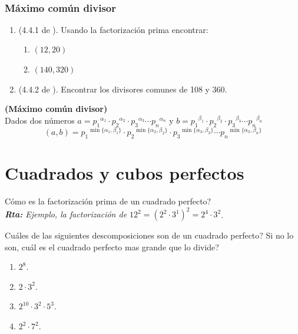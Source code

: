 \newpage
\begin{exers}{\ \\}
	\begin{center}
		\vspace{-1cm}
		\subsubsection*{ Máximo común divisor }\label{ejercicios_subsubsection_MCD}
	\end{center}

	\begin{enumerate}
		\item (4.4.1 de \cite{Aops_TN}). Usando la factorización prima encontrar:
		\begin{enumerate}[label=\Alph*)]
			\item $(12,20)$
			\item $(140,320)$
		\end{enumerate}
		\item (4.4.2 de \cite{Aops_TN}). Encontrar los divisores comunes de 108 y 360.
	\end{enumerate}
\end{exers}
\newpage

\begin{prop}\textbf{(Máximo común divisor)}\\
	Dados dos números $a={p_1}^{\alpha_1} \cdot {p_2}^{\alpha_2} \cdot {p_3}^{\alpha_3} \cdots {p_n}^{\alpha_n}$ y $b={p_1}^{\beta_1} \cdot {p_2}^{\beta_2} \cdot {p_3}^{\beta_3} \cdots {p_n}^{\beta_n}$
	\[
	(a,b)= {p_1}^{\min\{\alpha_1,\beta_1\}} \cdot {p_2}^{\min\{\alpha_2,\beta_2\}} \cdot {p_3}^{\min\{\alpha_3,\beta_3\}} \cdots {p_n}^{\min\{\alpha_3,\beta_n\}}
	\]
\end{prop}

\section{Cuadrados y cubos perfectos}\label{section_cuadrados_cubos_perfectos}

\begin{ejemplo}
	Cómo es la factorización prima de un cuadrado perfecto?\\
	\textit{\textbf{Rta:} Ejemplo, la factorización de $12^2={(2^2\cdot 3^1)}^2=2^4\cdot 3^2$}.
		
	Cuáles de las siguientes descomposiciones son de un cuadrado perfecto? Si no lo son, cuál es el cuadrado perfecto mas grande que lo divide?
	\begin{enumerate}[label=\Alph*)]
	\item $2^8$. 
	\item $2\cdot3^2$. 
	\item $2^{10}\cdot3^2\cdot 5^3$.
	\item $2^2\cdot 7^2$.
	\end{enumerate}
\end{ejemplo}

